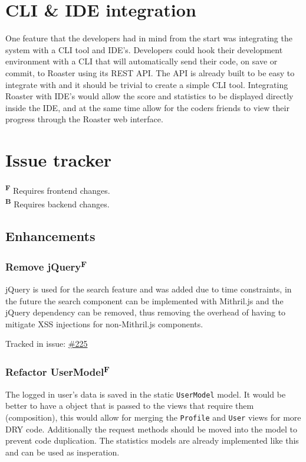 \documentclass[12pt,a4paper]{report}
\begin{document}
\section{CLI \& IDE integration}
One feature that the developers had in mind from the start was integrating the system with a CLI tool and IDE's. Developers could hook their development environment with a CLI that will automatically send their code, on save or commit, to Roaster using its REST API. The API is already built to be easy to integrate with and it should be trivial to create a simple CLI tool. Integrating Roaster with IDE's would allow the score and statistics to be displayed directly inside the IDE, and at the same time allow for the coders friends to view their progress through the Roaster web interface.

\section{Issue tracker}
\label{sec:issue-tracker}
\textbf{\textsuperscript{F}} Requires frontend changes. \\
\textbf{\textsuperscript{B}} Requires backend changes.

\subsection*{Enhancements}
\subsubsection{Remove jQuery\texorpdfstring{\textsuperscript{F}}{}}
\label{subsec:remove-jquery}
jQuery is used for the search feature and was added due to time constraints, in the future the search component can be implemented with Mithril.js and the jQuery dependency can be removed, thus removing the overhead of having to mitigate XSS injections for non-Mithril.js components.

Tracked in issue: \href{https://github.com/LuleaUniversityOfTechnology/2018-project-roaster/issues/225}{\#225}

\subsubsection{Refactor UserModel\texorpdfstring{\textsuperscript{F}}{}}
The logged in user's data is saved in the static \texttt{UserModel} model. It would be better to have a object that is passed to the views that require them (composition), this would allow for merging the \texttt{Profile} and \texttt{User} views for more DRY code. Additionally the request methods should be moved into the model to prevent code duplication. The statistics models are already implemented like this and can be used as insperation.
\end{document}
